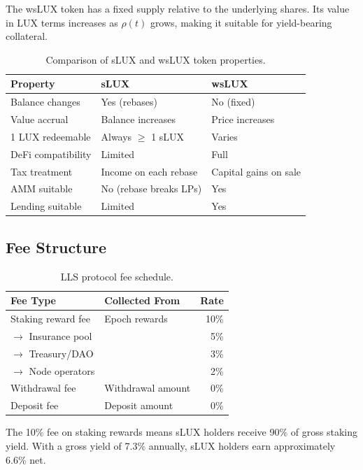 The wsLUX token has a fixed supply relative to the underlying shares. Its value in LUX terms increases as $\rho(t)$ grows, making it suitable for yield-bearing collateral.

\begin{table}[H]
\centering
\caption{Comparison of sLUX and wsLUX token properties.}
\label{tab:token_comparison}
\begin{tabular}{lll}
\toprule
\textbf{Property} & \textbf{sLUX} & \textbf{wsLUX} \\
\midrule
Balance changes & Yes (rebases) & No (fixed) \\
Value accrual & Balance increases & Price increases \\
1 LUX redeemable & Always $\geq$ 1 sLUX & Varies \\
DeFi compatibility & Limited & Full \\
Tax treatment & Income on each rebase & Capital gains on sale \\
AMM suitable & No (rebase breaks LPs) & Yes \\
Lending suitable & Limited & Yes \\
\bottomrule
\end{tabular}
\end{table}

\subsection{Fee Structure}

\begin{table}[H]
\centering
\caption{LLS protocol fee schedule.}
\label{tab:fees}
\begin{tabular}{llr}
\toprule
\textbf{Fee Type} & \textbf{Collected From} & \textbf{Rate} \\
\midrule
Staking reward fee & Epoch rewards & 10\% \\
\quad$\to$ Insurance pool & & 5\% \\
\quad$\to$ Treasury/DAO & & 3\% \\
\quad$\to$ Node operators & & 2\% \\
Withdrawal fee & Withdrawal amount & 0\% \\
Deposit fee & Deposit amount & 0\% \\
\bottomrule
\end{tabular}
\end{table}

The 10\% fee on staking rewards means sLUX holders receive 90\% of gross staking yield. With a gross yield of 7.3\% annually, sLUX holders earn approximately 6.6\% net.

